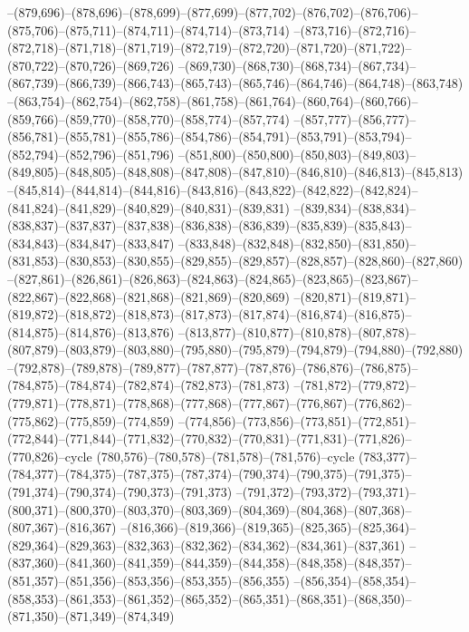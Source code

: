 --(879,696)--(878,696)--(878,699)--(877,699)--(877,702)--(876,702)--(876,706)--(875,706)--(875,711)--(874,711)--(874,714)--(873,714)
--(873,716)--(872,716)--(872,718)--(871,718)--(871,719)--(872,719)--(872,720)--(871,720)--(871,722)--(870,722)--(870,726)--(869,726)
--(869,730)--(868,730)--(868,734)--(867,734)--(867,739)--(866,739)--(866,743)--(865,743)--(865,746)--(864,746)--(864,748)--(863,748)
--(863,754)--(862,754)--(862,758)--(861,758)--(861,764)--(860,764)--(860,766)--(859,766)--(859,770)--(858,770)--(858,774)--(857,774)
--(857,777)--(856,777)--(856,781)--(855,781)--(855,786)--(854,786)--(854,791)--(853,791)--(853,794)--(852,794)--(852,796)--(851,796)
--(851,800)--(850,800)--(850,803)--(849,803)--(849,805)--(848,805)--(848,808)--(847,808)--(847,810)--(846,810)--(846,813)--(845,813)
--(845,814)--(844,814)--(844,816)--(843,816)--(843,822)--(842,822)--(842,824)--(841,824)--(841,829)--(840,829)--(840,831)--(839,831)
--(839,834)--(838,834)--(838,837)--(837,837)--(837,838)--(836,838)--(836,839)--(835,839)--(835,843)--(834,843)--(834,847)--(833,847)
--(833,848)--(832,848)--(832,850)--(831,850)--(831,853)--(830,853)--(830,855)--(829,855)--(829,857)--(828,857)--(828,860)--(827,860)
--(827,861)--(826,861)--(826,863)--(824,863)--(824,865)--(823,865)--(823,867)--(822,867)--(822,868)--(821,868)--(821,869)--(820,869)
--(820,871)--(819,871)--(819,872)--(818,872)--(818,873)--(817,873)--(817,874)--(816,874)--(816,875)--(814,875)--(814,876)--(813,876)
--(813,877)--(810,877)--(810,878)--(807,878)--(807,879)--(803,879)--(803,880)--(795,880)--(795,879)--(794,879)--(794,880)--(792,880)
--(792,878)--(789,878)--(789,877)--(787,877)--(787,876)--(786,876)--(786,875)--(784,875)--(784,874)--(782,874)--(782,873)--(781,873)
--(781,872)--(779,872)--(779,871)--(778,871)--(778,868)--(777,868)--(777,867)--(776,867)--(776,862)--(775,862)--(775,859)--(774,859)
--(774,856)--(773,856)--(773,851)--(772,851)--(772,844)--(771,844)--(771,832)--(770,832)--(770,831)--(771,831)--(771,826)--(770,826)--cycle
(780,576)--(780,578)--(781,578)--(781,576)--cycle
(783,377)--(784,377)--(784,375)--(787,375)--(787,374)--(790,374)--(790,375)--(791,375)--(791,374)--(790,374)--(790,373)--(791,373)
--(791,372)--(793,372)--(793,371)--(800,371)--(800,370)--(803,370)--(803,369)--(804,369)--(804,368)--(807,368)--(807,367)--(816,367)
--(816,366)--(819,366)--(819,365)--(825,365)--(825,364)--(829,364)--(829,363)--(832,363)--(832,362)--(834,362)--(834,361)--(837,361)
--(837,360)--(841,360)--(841,359)--(844,359)--(844,358)--(848,358)--(848,357)--(851,357)--(851,356)--(853,356)--(853,355)--(856,355)
--(856,354)--(858,354)--(858,353)--(861,353)--(861,352)--(865,352)--(865,351)--(868,351)--(868,350)--(871,350)--(871,349)--(874,349)
